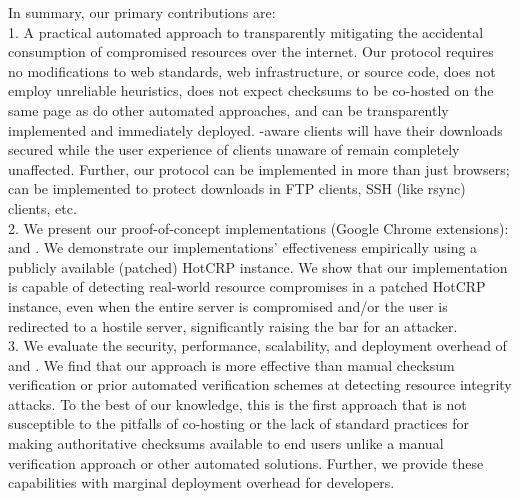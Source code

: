 In summary, our primary contributions are: \\

1. A practical automated approach to transparently mitigating the accidental
consumption of compromised resources over the internet. Our protocol requires no
modifications to web standards, web infrastructure, or source code, does not
employ unreliable heuristics, does not expect checksums to be co-hosted on the
same page as do other automated approaches, and can be transparently implemented
and immediately deployed. \SYSTEM{}-aware clients will have their downloads
secured while the user experience of clients unaware of \SYSTEM{} remain
completely unaffected. Further, our protocol can be implemented in more than
just browsers; \SYSTEM{} can be implemented to protect downloads in FTP clients,
SSH (like rsync) clients, etc. \\

2. We present our proof-of-concept \SYSTEM{} implementations (Google Chrome
extensions): \DNSSYS{} and \DHTSYS{}. We demonstrate our implementations'
effectiveness empirically using a publicly available (patched) HotCRP instance.
We show that our \DNSSYS{} implementation is capable of detecting real-world
resource compromises in a patched HotCRP instance, even when the entire server
is compromised and/or the user is redirected to a hostile server, significantly
raising the bar for an attacker. \\

3. We evaluate the security, performance, scalability, and deployment overhead
of \DNSSYS{} and \DHTSYS{}. We find that our approach is more effective than
manual checksum verification or prior automated verification schemes at
detecting resource integrity attacks. To the best of our knowledge, this is the
first approach that is not susceptible to the pitfalls of co-hosting or the lack
of standard practices for making authoritative checksums available to end users
unlike a manual verification approach or other automated solutions. Further, we
provide these capabilities with marginal deployment overhead for developers.
